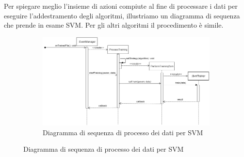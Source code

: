 		Per spiegare meglio l'insieme di azioni compiute al fine di processare i dati per eseguire l'addestramento degli algoritmi, illustriamo un diagramma di sequenza che prende in esame SVM\glo. Per gli altri algoritmi il procedimento è simile.
		\mbox{}
		\begin{landscape}
			\begin{figure}
				\begin{figure} [H]
					\includegraphics[width=\linewidth]{img/Diagrammi/ds-app.png}
					\caption{Diagramma di sequenza di processo dei dati per SVM}
				\end{figure}
			\end{figure}
		\end{landscape}
